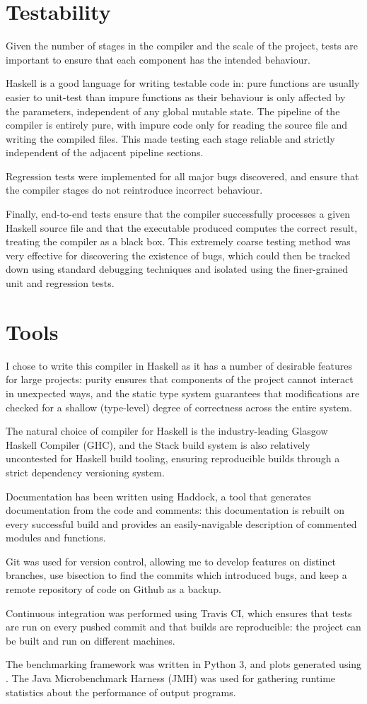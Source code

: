 \documentclass[dissertation.tex]{subfiles}
\begin{document}
\section{Testability}
{
    Given the number of stages in the compiler and the scale of the project, tests are important to ensure that each component has the intended behaviour.
    
    Haskell is a good language for writing testable code in: pure functions are usually easier to unit-test than impure functions as their behaviour is only affected by the parameters, independent of any global mutable state. The pipeline of the compiler is entirely pure, with impure code only for reading the source file and writing the compiled files. This made testing each stage reliable and strictly independent of the adjacent pipeline sections.

    Regression tests were implemented for all major bugs discovered, and ensure that the compiler stages do not reintroduce incorrect behaviour. 

    Finally, end-to-end tests ensure that the compiler successfully processes a given Haskell source file and that the executable produced computes the correct result, treating the compiler as a black box. This extremely coarse testing method was very effective for discovering the existence of bugs, which could then be tracked down using standard debugging techniques and isolated using the finer-grained unit and regression tests. 
}
\section{Tools}
{
    I chose to write this compiler in Haskell as it has a number of desirable features for large projects: purity ensures that components of the project cannot interact in unexpected ways, and the static type system guarantees that modifications are checked for a shallow (type-level) degree of correctness across the entire system.

    The natural choice of compiler for Haskell is the industry-leading Glasgow Haskell Compiler (GHC), and the Stack build system is also relatively uncontested for Haskell build tooling, ensuring reproducible builds through a strict dependency versioning system.

    Documentation has been written using Haddock, a tool that generates documentation from the code and comments: this documentation is rebuilt on every successful build and provides an easily-navigable description of commented modules and functions.

    Git was used for version control, allowing me to develop features on distinct branches, use bisection to find the commits which introduced bugs, and keep a remote repository of code on Github as a backup. 

    Continuous integration was performed using Travis CI, which ensures that tests are run on every pushed commit and that builds are reproducible: the project can be built and run on different machines.

    The benchmarking framework was written in Python 3, and plots generated using . The Java Microbenchmark Harness (JMH) was used for gathering runtime statistics about the performance of output programs. 
}
\end{document}
